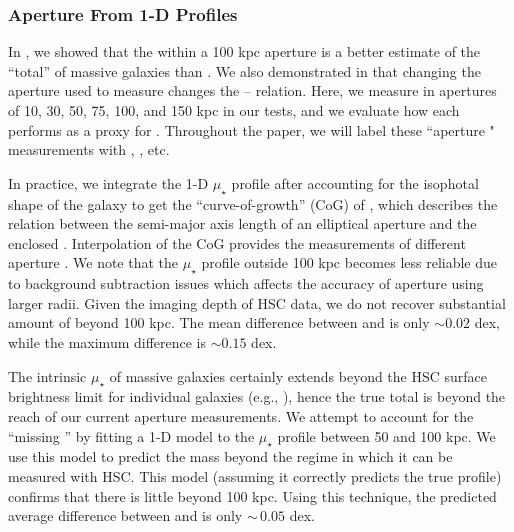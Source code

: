 \documentclass[fleqn,usenatbib,useAMS]{mnras}
\begin{document}
\begin{CJK*}{UTF8}{gbsn}
\subsubsection{Aperture \mstar{} From 1-D Profiles}
    \label{sec:maper}

    In \citet{Huang2018b}, we showed that the \mstar{} within a 100 kpc aperture is a better
    estimate of the ``total'' \mstar{} of massive galaxies than \mcmodel{}. 
    We also demonstrated in \citet{Huang2018c, Huang2020} that changing the aperture used to measure
    \mstar{} changes the \mstar{}--\mvir{} relation.
    Here, we measure \mstar{} in apertures of 10, 30, 50, 75, 100, and 150 kpc in our \topn{} tests,
    and we evaluate how each performs as a proxy for \mvir{}. 
    Throughout the paper, we will label these ``aperture \mstar{}" measurements with ,
    , etc. 

    In practice, we integrate the 1-D $\mu_{\star}$ profile after accounting for the isophotal shape
    of the galaxy to get the ``curve-of-growth'' (CoG) of \mstar{}, which describes the relation
    between the semi-major axis length of an elliptical aperture and the enclosed \mstar{}.
    Interpolation of the CoG provides the measurements of different aperture \mstar{}.
    We note that the $\mu_{\star}$ profile outside 100 kpc becomes less reliable due to background
    subtraction issues which affects the accuracy of aperture \mstar{} using larger radii.
    Given the imaging depth of HSC data, we do not recover substantial amount of \mstar{} beyond 100
    kpc.
    The mean difference between  and  is only $\sim 0.02$ dex, while the
    maximum difference is $\sim 0.15$ dex. 

    The intrinsic $\mu_{\star}$ of massive galaxies certainly extends beyond the HSC surface
    brightness limit for individual galaxies (e.g., \citealt{Wang2019, Zhang2019, Montes2021,
    Kluge2021}), hence the true total \mstar{} is beyond the reach of our current aperture \mstar{}
    measurements.
    We attempt to account for the ``missing \mstar{}'' by fitting a 1-D \ser{} model to the
    $\mu_{\star}$ profile between 50 and 100 kpc. We use this model to predict the mass beyond
    the regime in which it can be measured with HSC.
    This model (assuming it correctly predicts the true profile) confirms that there is little
    \mstar{} beyond 100 kpc.
    Using this technique, the predicted average difference between  and  is
    only $\sim\,0.05$ dex.


\end{CJK*}
\end{document}

